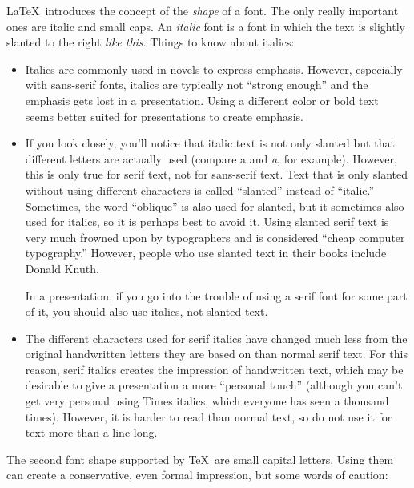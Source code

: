 \LaTeX\ introduces the concept of the \emph{shape} of a font. The only
really important ones are italic and small caps.
An \emph{italic} font is a font in which the text is slightly slanted
to the right \emph{like this}. Things to know about
italics:
\begin{itemize}
\item
  Italics are commonly used in novels to express emphasis. However,
  especially with sans-serif fonts, italics are typically not ``strong
  enough'' and the emphasis gets lost in a presentation. Using a
  different color or bold text seems better suited for presentations
  to create emphasis. 
\item
  If you look closely, you'll notice that italic text is not only
  slanted but that different letters are actually used (compare a and
  \emph{a}, for example). However, this is only true for serif text,
  not for sans-serif text. Text that is only slanted without using
  different characters is called  ``slanted'' instead of ``italic.''
  Sometimes, the word ``oblique'' is also used for slanted, but it
  sometimes also used for italics, so it is perhaps best to avoid
  it. Using slanted serif text is very much frowned upon by
  typographers and is considered ``cheap computer typography.''
  However, people who use slanted text in their books include Donald
  Knuth.

  In a presentation, if you go into the trouble of using a serif font
  for some part of it, you should also use italics, not slanted text.
\item
  The different characters used for serif italics have changed much
  less  from the original handwritten letters they are based on than
  normal serif text. For this reason, serif italics creates the
  impression of handwritten text, which may be desirable to give a
  presentation a more ``personal touch'' (although you can't get very
  personal using Times italics, which everyone has seen a thousand
  times). However, it is harder to read than normal text, so do not
  use it for text more than a line long.
\end{itemize}

The second font shape supported by \TeX\ are small capital
letters. Using them can create a conservative, even formal
impression, but some words of caution:

